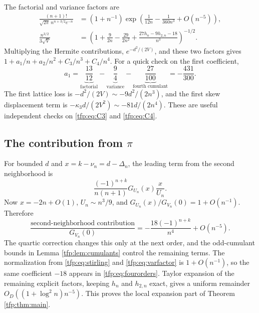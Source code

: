 \documentclass[11pt,a4paper]{article}
\numberwithin{equation}{section}
\theoremstyle{definition}\newtheorem{definition}[theorem]{Definition}
\theoremstyle{remark}\newtheorem{remark}[theorem]{Remark}
\begin{document}
The factorial and variance factors are
\begin{align}
 \frac{(n+1)!}{\sqrt{2\pi}\,n^{n+3/2}e^{-n}}
  &=(1+n^{-1})\exp\!\left(\frac1{12n}-\frac1{360n^3}
                           +O(n^{-5})\right),\label{tfp:eq:stirling}\\
 \frac{n^{3/2}}{3\sqrt V}
  &=\left(1+\frac9{2n}-\frac{29}{2n^2}
                +\frac{27h_n-9h_{2,n}-18}{n^3}\right)^{-1/2}.
                \label{tfp:eq:varfactor}
\end{align}
Multiplying the Hermite contributions, $e^{-d^2/(2V)}$, and these two
factors gives $1+a_1/n+a_2/n^2+C_3/n^3+C_4/n^4$.
For a quick check on the first coefficient,
\begin{equation}
 a_1=\underbrace{\frac{13}{12}}_{\text{factorial}}
          -\underbrace{\frac94}_{\text{variance}}
          -\underbrace{\frac{27}{100}}_{\text{fourth cumulant}}
        =-\frac{431}{300}.
\end{equation}
The first lattice loss is $-d^2/(2V)\sim-9d^2/(2n^3)$,
and the first skew displacement term is
$-\kappa_3d/(2V^2)\sim-81d/(2n^4)$. These are useful independent checks
on \eqref{tfp:eq:C3} and \eqref{tfp:eq:C4}.

\subsection{The contribution from \texorpdfstring{$\pi$}{pi}}
For bounded $d$ and $x=k-\nu_n=d-\Delta_n$, the leading term from the
second neighborhood is
\begin{equation}\label{tfp:eq:piapprox}
 \frac{(-1)^{n+k}}{n(n+1)}G_{U_n}(x)\frac{x}{U_n}.
\end{equation}
Now $x=-2n+O(1)$, $U_n\sim n^3/9$, and
$G_{U_n}(x)/G_{V_n}(0)=1+O(n^{-1})$. Therefore
\begin{equation}\label{tfp:eq:pileading}
 \frac{\text{second-neighborhood contribution}}{G_{V_n}(0)}
   =-\frac{18(-1)^{n+k}}{n^4}+O(n^{-5}).
\end{equation}
The quartic correction changes this only at the next order, and the
odd-cumulant bounds in Lemma \ref{tfp:lem:cumulants} control the remaining
terms. The normalization from \eqref{tfp:eq:stirling} and
\eqref{tfp:eq:varfactor} is $1+O(n^{-1})$, so the same coefficient $-18$
appears in \eqref{tfp:eq:fourorders}. Taylor expansion of the remaining
explicit factors, keeping $h_n$ and $h_{2,n}$ exact, gives a uniform
remainder $O_D((1+\log^2 n)n^{-5})$. This proves the local expansion
part of Theorem \ref{tfp:thm:main}.
\end{document}

